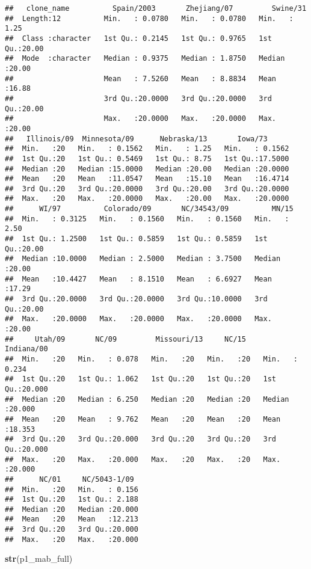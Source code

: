 \documentclass[]{article}
\newenvironment{Shaded}{\begin{snugshade}}{\end{snugshade}}
\newcommand{\KeywordTok}[1]{\textcolor[rgb]{0.13,0.29,0.53}{\textbf{#1}}}
\newcommand{\NormalTok}[1]{#1}
\begin{document}
\begin{verbatim}
##   clone_name          Spain/2003       Zhejiang/07         Swine/31    
##  Length:12          Min.   : 0.0780   Min.   : 0.0780   Min.   : 1.25  
##  Class :character   1st Qu.: 0.2145   1st Qu.: 0.9765   1st Qu.:20.00  
##  Mode  :character   Median : 0.9375   Median : 1.8750   Median :20.00  
##                     Mean   : 7.5260   Mean   : 8.8834   Mean   :16.88  
##                     3rd Qu.:20.0000   3rd Qu.:20.0000   3rd Qu.:20.00  
##                     Max.   :20.0000   Max.   :20.0000   Max.   :20.00  
##   Illinois/09  Minnesota/09      Nebraska/13       Iowa/73       
##  Min.   :20   Min.   : 0.1562   Min.   : 1.25   Min.   : 0.1562  
##  1st Qu.:20   1st Qu.: 0.5469   1st Qu.: 8.75   1st Qu.:17.5000  
##  Median :20   Median :15.0000   Median :20.00   Median :20.0000  
##  Mean   :20   Mean   :11.0547   Mean   :15.10   Mean   :16.4714  
##  3rd Qu.:20   3rd Qu.:20.0000   3rd Qu.:20.00   3rd Qu.:20.0000  
##  Max.   :20   Max.   :20.0000   Max.   :20.00   Max.   :20.0000  
##      WI/97          Colorado/09       NC/34543/09          MN/15      
##  Min.   : 0.3125   Min.   : 0.1560   Min.   : 0.1560   Min.   : 2.50  
##  1st Qu.: 1.2500   1st Qu.: 0.5859   1st Qu.: 0.5859   1st Qu.:20.00  
##  Median :10.0000   Median : 2.5000   Median : 3.7500   Median :20.00  
##  Mean   :10.4427   Mean   : 8.1510   Mean   : 6.6927   Mean   :17.29  
##  3rd Qu.:20.0000   3rd Qu.:20.0000   3rd Qu.:10.0000   3rd Qu.:20.00  
##  Max.   :20.0000   Max.   :20.0000   Max.   :20.0000   Max.   :20.00  
##     Utah/09       NC/09         Missouri/13     NC/15      Indiana/00    
##  Min.   :20   Min.   : 0.078   Min.   :20   Min.   :20   Min.   : 0.234  
##  1st Qu.:20   1st Qu.: 1.062   1st Qu.:20   1st Qu.:20   1st Qu.:20.000  
##  Median :20   Median : 6.250   Median :20   Median :20   Median :20.000  
##  Mean   :20   Mean   : 9.762   Mean   :20   Mean   :20   Mean   :18.353  
##  3rd Qu.:20   3rd Qu.:20.000   3rd Qu.:20   3rd Qu.:20   3rd Qu.:20.000  
##  Max.   :20   Max.   :20.000   Max.   :20   Max.   :20   Max.   :20.000  
##      NC/01     NC/5043-1/09   
##  Min.   :20   Min.   : 0.156  
##  1st Qu.:20   1st Qu.: 2.188  
##  Median :20   Median :20.000  
##  Mean   :20   Mean   :12.213  
##  3rd Qu.:20   3rd Qu.:20.000  
##  Max.   :20   Max.   :20.000
\end{verbatim}

\begin{Shaded}
\begin{Highlighting}[]
\KeywordTok{str}\NormalTok{(p1_mab_full)}
\end{Highlighting}
\end{Shaded}
\end{document}
